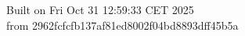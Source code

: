 {\noindent Built on Fri Oct 31 12:59:33 CET 2025} \\ 
 {\noindent from 2962fcfcfb137af81ed8002f04bd8893dff45b5a}
